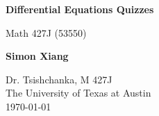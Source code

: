 \documentclass{article}
\begin{document}
\begin{titlepage}
    \begin{center}
        \vspace*{1cm}
 
        \Huge
        \textbf{Differential Equations Quizzes}
 
        \vspace{0.5cm}
        \LARGE
        Math 427J (53550)

        \vspace{1.5cm}
 
        \textbf{Simon Xiang}
 
        \vfill
  
        \vspace{0.8cm}
 
        \Large
    	Dr. Tsishchanka, M 427J\\
        The University of Texas at Austin\\
        \today
 
    \end{center}
\end{titlepage}
    
\end{document}
